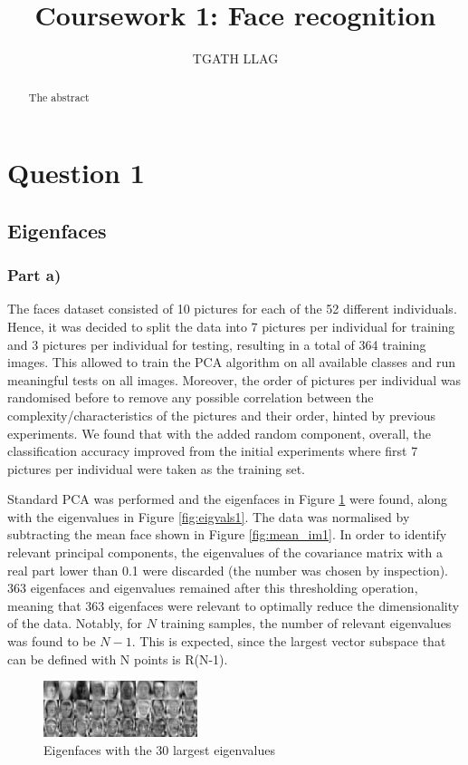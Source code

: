 \documentclass[10pt,technote]{IEEEtran}
\title{Coursework 1: Face recognition }
\author{TGATH LLAG}
\begin{document}
\maketitle
\begin{abstract}
The abstract
\end{abstract}

\section{Question 1}
\subsection{Eigenfaces}
\subsubsection{Part a)}
The faces dataset consisted of 10 pictures for each of the 52 different individuals. Hence, it was decided to split the data into 7 pictures per individual for training and 3 pictures per individual for testing, resulting in a total of 364 training images. This allowed to train the PCA algorithm on all available classes and run meaningful tests on all images. Moreover, the order of pictures per individual was randomised before to remove any possible correlation between the complexity/characteristics of the pictures and their order, hinted by previous experiments. We found that with the added random component, overall, the classification accuracy improved from the initial experiments where first 7  pictures per individual were taken as the training set.

Standard PCA was performed and the eigenfaces in Figure \ref{fig:eigfaces1} were found, along with the eigenvalues in Figure \ref{fig:eigvals1}. The data was normalised by subtracting the mean face shown in Figure \ref{fig:mean_im1}. In order to identify relevant principal components, the eigenvalues of the covariance matrix with a real part lower than 0.1 were discarded (the number was chosen by inspection). 363 eigenfaces and eigenvalues remained after this thresholding operation, meaning that 363 eigenfaces were relevant to optimally reduce the dimensionality of the data. Notably, for $N$ training samples, the number of relevant eigenvalues was found to be $N - 1$. This is expected, since the largest vector subspace that can be defined with N points is R(N-1).

\begin{figure}[htb!]
    \centering
    \includegraphics[width=0.4\textwidth]{../results/ex1a/eigenfaces.png}
    \caption{Eigenfaces with the 30 largest eigenvalues}
    \label{fig:eigfaces1}
\end{figure}
\end{document}
